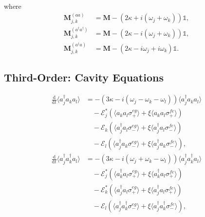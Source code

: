 \documentclass{article}
\newcommand{\ddt}[1][]{\frac{\mathrm{d} #1}{\mathrm{d}t}}
\begin{document}
where
\begin{subequations}
\begin{align}
	\bm{M}_{j, k}^{(aa)} &= \bm{M} - \left( 2 \kappa + i \left( \omega_{j} + \omega_{k} \right) \right) \mathbb{1}, \\
	\bm{M}_{j, k}^{(a^{\dagger} a^{\dagger})} &= \bm{M} - \left( 2 \kappa - i \left( \omega_{j} + \omega_{k} \right) \right) \mathbb{1}, \\
	\bm{M}_{j, k}^{(a^{\dagger} a)} &= \bm{M} - \left( 2 \kappa - i \omega_{j} + i \omega_{k} \right) \mathbb{1}.
\end{align}
\end{subequations}

\subsection{Third-Order: Cavity Equations}

\begin{subequations}
\begin{align}
	\ddt \langle a^{\dagger}_{j} a_{k} a_{l} \rangle &= -\left( 3 \kappa - i \left( \omega_{j} - \omega_{k} - \omega_{l} \right) \right) \langle a^{\dagger}_{j} a_{k} a_{l} \rangle \nonumber \\
	&\quad - \mathcal{E}_{j}^{*} \left( \langle a_{k} a_{l} \sigma^{eg}_{+} \rangle + \xi \langle a_{k} a_{l} \sigma^{fe}_{+} \rangle \right) \nonumber \\
	&\quad - \mathcal{E}_{k} \left( \langle a^{\dagger}_{j} a_{l} \sigma^{eg}_{-} \rangle + \xi \langle a^{\dagger}_{j} a_{l} \sigma^{fe}_{-} \rangle \right) \nonumber \\
	&\quad - \mathcal{E}_{l} \left( \langle a^{\dagger}_{j} a_{k} \sigma^{eg}_{-} \rangle + \xi \langle a^{\dagger}_{j} a_{k} \sigma^{fe}_{-} \rangle \right) , \\
	\ddt \langle a^{\dagger}_{j} a^{\dagger}_{k} a_{l} \rangle &= -\left( 3 \kappa - i \left( \omega_{j} + \omega_{k} - \omega_{l} \right) \right) \langle a^{\dagger}_{j} a^{\dagger}_{k} a_{l} \rangle \nonumber \\
	&\quad - \mathcal{E}_{j}^{*} \left( \langle a^{\dagger}_{k} a_{l} \sigma^{eg}_{+} \rangle + \xi \langle a^{\dagger}_{k} a_{l} \sigma^{fe}_{+} \rangle \right) \nonumber \\
	&\quad - \mathcal{E}_{k}^{*} \left( \langle a^{\dagger}_{j} a_{l} \sigma^{eg}_{+} \rangle + \xi \langle a^{\dagger}_{j} a_{l} \sigma^{fe}_{+} \rangle \right) \nonumber \\
	&\quad - \mathcal{E}_{l} \left( \langle a^{\dagger}_{j} a^{\dagger}_{k} \sigma^{eg}_{-} \rangle + \xi \langle a^{\dagger}_{j} a^{\dagger}_{k} \sigma^{fe}_{-} \rangle \right) ,
\end{align}
\end{subequations}
\end{document}
